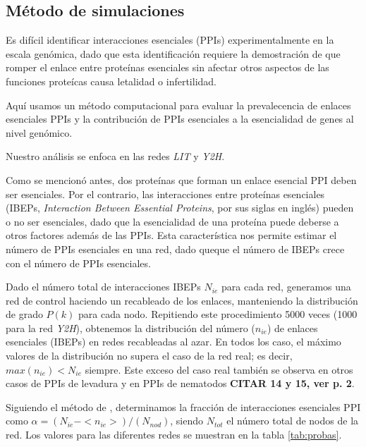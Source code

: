 
\subsection{M\'etodo de simulaciones}
\label{sec:simulacion}

Es dif\'icil identificar interacciones esenciales (PPIs) experimentalmente en la escala gen\'omica, dado que esta identificaci\'on requiere la demostraci\'on de que romper el enlace entre prote\'inas esenciales sin afectar otros aspectos de las funciones prote\'icas causa letalidad o infertilidad.

Aqu\'i usamos un m\'etodo computacional para evaluar la prevalecencia de enlaces esenciales PPIs y la contribuci\'on de PPIs esenciales a la esencialidad de genes al nivel gen\'omico.

Nuestro an\'alisis se enfoca en las redes {\it LIT} y {\it Y2H}.

Como se mencion\'o antes, dos prote\'inas que forman un enlace esencial PPI deben ser esenciales.
Por el contrario, las interacciones entre prote\'inas esenciales (IBEPs, {\it Interaction Between Essential Proteins}, por sus siglas en ingl\'es) pueden o no ser esenciales, dado que la esencialidad de una prote\'ina puede deberse a otros factores adem\'as de las PPIs.
Esta caracter\'istica nos permite estimar el n\'umero de PPIs esenciales en una red, dado queque el n\'umero de IBEPs crece con el n\'umero de PPIs esenciales.

Dado el n\'umero total de interacciones IBEPs $N_{ie}$ para cada red, generamos una red de control haciendo un recableado de los enlaces, manteniendo la distribuci\'on de grado $P(k)$ para cada nodo.
Repitiendo este procedimiento 5000 veces (1000 para la red {\it Y2H}), obtenemos la distribuci\'on del n\'umero ($n_{ie}$) de enlaces esenciales (IBEPs) en redes recableadas al azar.
En todos los caso, el m\'aximo valores de la distribuci\'on no supera el caso de la red real; es decir, $max(n_{ie}) < N_{ie}$ siempre.
Este exceso del caso real tambi\'en se observa en otros casos de PPIs de levadura y en PPIs de nematodos {\bf CITAR 14 y 15, ver p. 2}.

Siguiendo el m\'etodo de \cite{he2006}, determinamos la fracci\'on de interacciones esenciales PPI como $\alpha = (N_{ie} - <n_{ie}>)/(N_{nod})$, siendo $N_{tot}$ el n\'umero total de nodos de la red.
Los valores para las diferentes redes se muestran en la tabla \ref{tab:probas}.


